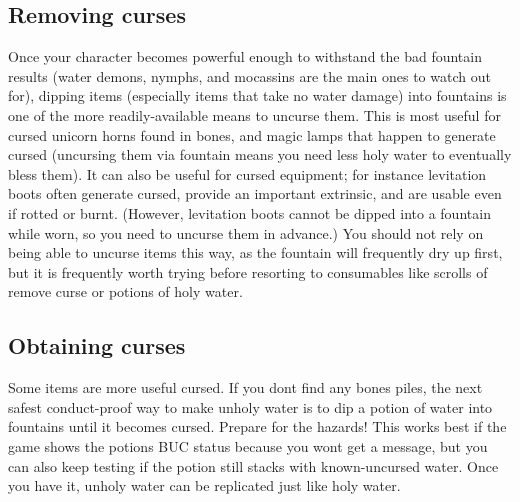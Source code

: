 \subsection{Removing curses}
\label{15}
Once your character becomes powerful enough to withstand the bad fountain results (water demons, nymphs, and mocassins are the main ones to watch out for), dipping items (especially items that take no water damage) into fountains is one of the more readily-{}available means to uncurse them.  This is most useful for cursed unicorn horns\footnotemark[120] found in bones, and magic lamps\footnotemark[121] that happen to generate cursed (uncursing them via fountain means you need less holy water to eventually bless them). It can also be useful for cursed equipment; for instance levitation boots\footnotemark[122] often generate cursed, provide an important extrinsic, and are usable even if rotted or burnt. (However, levitation boots cannot be dipped into a fountain while worn, so you need to uncurse them in advance.) You should not rely on being able to uncurse items this way, as the fountain will frequently dry up first, but it is frequently worth trying before resorting to consumables like scrolls of remove curse\footnotemark[123] or potions of holy water\footnotemark[124].



\subsection{Obtaining curses}
\label{16}
Some items are more useful cursed\footnotemark[125]. If you don\textquotesingle{}t find any bones\footnotemark[126] piles, the next safest conduct\footnotemark[127]-{}proof way to make unholy water\footnotemark[128] is to dip a potion of water\footnotemark[129] into fountains until it becomes cursed. Prepare for the hazards! This works best if the game shows the potion\textquotesingle{}s BUC\footnotemark[130] status because you won\textquotesingle{}t get a message, but you can also keep testing if the potion still stacks\footnotemark[131] with known-{}uncursed water. Once you have it, unholy water can be replicated just like holy water.


